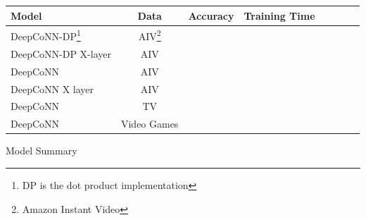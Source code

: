 \documentclass[10pt,twocolumn,letterpaper]{article}
\begin{document}
\begin{exhibit}
\begin{center}
{\small
\begin{tabular}{l|ccccccc}
\hline
Model & Data & Accuracy & Training Time & & & &  \\
\hline
DeepCoNN-DP\footnote{DP is the dot product implementation} & AIV\footnote{Amazon Instant Video} & & & & & & \\
DeepCoNN-DP X-layer & AIV & & & & & &\\
DeepCoNN & AIV & & & & & &\\
DeepCoNN X layer & AIV & & & & & &\\
DeepCoNN & TV & & & & & &\\
DeepCoNN & Video Games & & & & & &\\
\hline
\end{tabular}
}
\end{center}
\label{table2}
\caption{Model Summary}
\end{exhibit}
\end{document}

